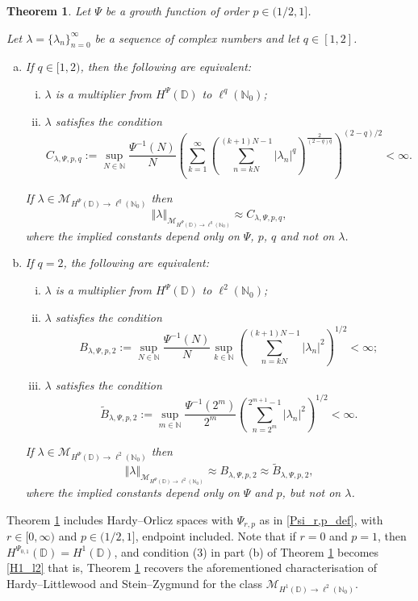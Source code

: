 \documentclass[a4paper, leqno, 10pt]{amsart}
\numberwithin{equation}{section}
\newtheorem{thm}{Theorem}
\newcommand{\norm}[1]{\left\Vert#1\right\Vert}
\newcommand{\D}{\mathbb{D}}
\newcommand{\N}{\mathbb{N}}
\begin{document}
\begin{thm}\label{gen_mult_q_leq2}
Let $\Psi$ be a growth function of order $p \in (1/2,1]$.

Let $\lambda = \{ \lambda_n \}_{n=0}^{\infty}$ be a sequence of complex numbers and let $q \in [1,2]$.
\begin{enumerate}[(a)]
\item  If $q \in [1,2)$,  then the following are equivalent:
\begin{enumerate}[(i)]
\item $\lambda$  is a multiplier from $H^{\Psi}(\D)$ to $\ell^q (\N_0)$;
\item $\lambda$ satisfies the condition
\[
C_{\lambda, \Psi, p, q} := \sup_{N \in \N} \frac{ \Psi^{-1}(N)}{N} 
\left(\sum_{k=1}^\infty \left(\sum_{n= k N}^{(k+1)N -1} |\lambda_n|^q \right)^\frac{2}{(2-q)q} \right)^{(2-q)/2} < \infty.
\]
\end{enumerate}
If $\lambda \in \mathcal{M}_{H^{\Psi}(\D) \rightarrow \ell^q (\N_0)}$ then
\[
\norm{ \lambda }_{\mathcal{M}_{H^{\Psi}(\D) \rightarrow \ell^q (\N_0)}} \approx C_{\lambda, \Psi, p, q} ,
\]
where the implied constants depend only on $\Psi$, $p$, $q$ and not on $\lambda$. 
\item  If $q=2$, the following are equivalent:
\begin{enumerate}[(i)]
\item $\lambda$ is a multiplier from $H^{\Psi}(\D)$ to $\ell^2 (\N_0)$;
\item $\lambda$ satisfies the condition
\[
B_{\lambda, \Psi, p, 2}:= \sup_{N \in \N} \frac{ \Psi^{-1}(N)}{N} \sup_{k \in \N} \left(\sum_{n= k N}^{(k+1)N -1} |\lambda_n|^2 \right)^{1/2}  < \infty;
\]
\item $\lambda$ satisfies the condition
\[
\widetilde{B}_{\lambda, \Psi, p, 2} := \sup_{m \in \N} \frac{ \Psi^{-1}(2^m)  }{2^m } \left(\sum_{n=2^m}^{2^{m+1} -1} |\lambda_n|^2 \right)^{1/2} < \infty.
\]
\end{enumerate}
If $\lambda \in \mathcal{M}_{H^{\Psi}(\D) \rightarrow \ell^2 (\N_0)}$ then
\[
\norm{ \lambda }_{\mathcal{M}_{H^{\Psi}(\D) \rightarrow \ell^2 (\N_0)}} \approx B_{\lambda, \Psi, p, 2} \approx \widetilde{B}_{\lambda, \Psi, p, 2},
\]
where the implied constants depend only on $\Psi$ and $p$, but not on $\lambda$.
\end{enumerate}
\end{thm}

Theorem \ref{gen_mult_q_leq2} includes Hardy--Orlicz spaces with $\Psi_{r,p}$ as in \eqref{Psi_r,p_def}, with $r \in [0, \infty) $ and $p \in (1/2,1]$, endpoint included. Note that if $r=0$ and $p=1$, then $H^{\Psi_{0,1}} (\D)= H^1 (\D)$, and condition (3) in part  (b) of Theorem \ref{gen_mult_q_leq2} becomes \eqref{H1_l2} that is, Theorem \ref{gen_mult_q_leq2} recovers the aforementioned characterisation of Hardy--Littlewood and Stein--Zygmund for the class $\mathcal{M}_{H^1(\D) \rightarrow \ell^2 (\N_0)}$. 
\end{document}
